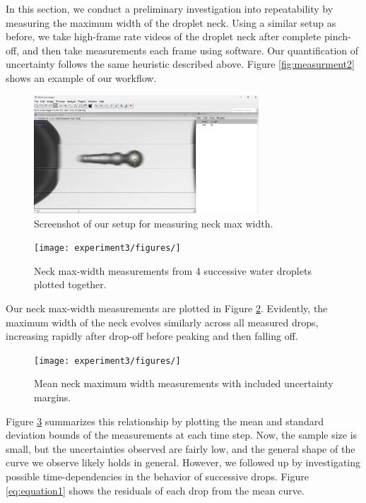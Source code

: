 \documentclass[12pt, letterpaper]{article}
\begin{document}
In this section, we conduct a preliminary investigation into repeatability by measuring the maximum width of the droplet neck. Using a similar setup as before, we take high-frame rate videos of the droplet neck after complete pinch-off, and then take measurements each frame using software. Our quantification of uncertainty follows the same heuristic described above. Figure \ref{fig:measurment2} shows an example of our workflow. 
\begin{figure}[!h]
    \centering
    \includegraphics[width=0.75\textwidth]{experiment3/figures/screenshots/measurement2.png}
    \caption{Screenshot of our setup for measuring neck max width. }
    \label{fig:measurement2}
\end{figure}

\begin{figure}[!h]
    \centering
    \texttt{[image: experiment3/figures/]}
    \caption{Neck max-width measurements from 4 successive water droplets plotted together. }
    \label{fig:repeatability1}
\end{figure}

Our neck max-width measurements are plotted in Figure \ref{fig:repeatability1}. Evidently, the maximum width of the neck evolves similarly across all measured drops, increasing rapidly after drop-off before peaking and then falling off. 
\begin{figure}[!h]
    \centering
    \texttt{[image: experiment3/figures/]}
    \caption{Mean neck maximum width measurements with included uncertainty margins. }
    \label{fig:repeatability-mean}
\end{figure}
Figure \ref{fig:repeatability-mean} summarizes this relationship by plotting the mean and standard deviation bounds of the measurements at each time step. Now, the sample size is small, but the uncertainties observed are fairly low, and the general shape of the curve we observe likely holds in general. However, we followed up by investigating possible time-dependencies in the behavior of successive drops. Figure \ref{eq:equation1} shows the residuals of each drop from the mean curve. 
\end{document}
